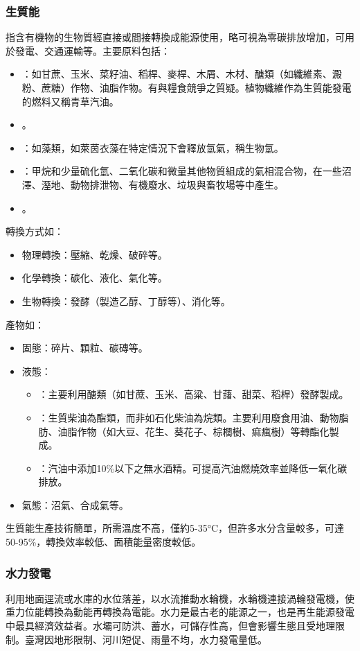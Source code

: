 \documentclass[a4paper,12pt]{report}
\begin{document}
\subsubsection{生質能}
指含有機物的生物質經直接或間接轉換成能源使用，略可視為零碳排放增加，可用於發電、交通運輸等。主要原料包括：
\begin{itemize}
\item {}：如甘蔗、玉米、菜籽油、稻桿、麥桿、木屑、木材、醣類（如纖維素、澱粉、蔗糖）作物、油脂作物。有與糧食競爭之質疑。植物纖維作為生質能發電的燃料又稱青草汽油。
\item {}。
\item {}：如藻類，如萊茵衣藻在特定情況下會釋放氫氣，稱生物氫。
\item {}：甲烷和少量硫化氫、二氧化碳和微量其他物質組成的氣相混合物，在一些沼澤、溼地、動物排泄物、有機廢水、垃圾與畜牧場等中產生。
\item {}。
\end{itemize}
轉換方式如：
\begin{itemize}
\item 物理轉換：壓縮、乾燥、破碎等。
\item 化學轉換：碳化、液化、氣化等。
\item 生物轉換：發酵（製造乙醇、丁醇等）、消化等。
\end{itemize}
產物如：
\begin{itemize}
\item 固態：碎片、顆粒、碳磚等。
\item 液態：
\begin{itemize}
\item {}：主要利用醣類（如甘蔗、玉米、高粱、甘藷、甜菜、稻桿）發酵製成。
\item {}：生質柴油為酯類，而非如石化柴油為烷類。主要利用廢食用油、動物脂肪、油脂作物（如大豆、花生、葵花子、棕櫚樹、痲瘋樹）等轉酯化製成。
\item {}：汽油中添加10\%以下之無水酒精。可提高汽油燃燒效率並降低一氧化碳排放。
\end{itemize}
\item 氣態：沼氣、合成氣等。
\end{itemize}
生質能生產技術簡單，所需溫度不高，僅約5-35°C，但許多水分含量較多，可達50-95\%，轉換效率較低、面積能量密度較低。
\subsubsection{水力發電}
利用地面逕流或水庫的水位落差，以水流推動水輪機，水輪機連接渦輪發電機，使重力位能轉換為動能再轉換為電能。水力是最古老的能源之一，也是再生能源發電中最具經濟效益者。水壩可防洪、蓄水，可儲存性高，但會影響生態且受地理限制。臺灣因地形限制、河川短促、雨量不均，水力發電量低。
\end{document}
